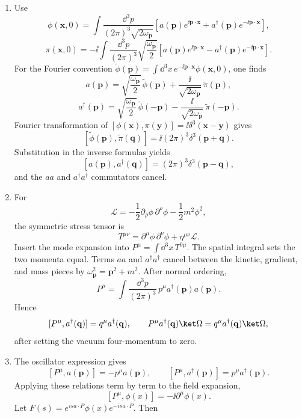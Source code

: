 \begin{enumerate}
\begin{enumerate}
\item
Use
\[
 \phi(\mathbf x,0)=\int\frac{\dd^3p}{(2\pi)^3\sqrt{2\omega_{\mathbf p}}}
 \left[a(\mathbf p)e^{\ii\mathbf p\cdot\mathbf x}
 +a^\dagger(\mathbf p)e^{-\ii\mathbf p\cdot\mathbf x}\right],
\]
\[
 \pi(\mathbf x,0)=-\ii\int\frac{\dd^3p}{(2\pi)^3}
 \sqrt{\frac{\omega_{\mathbf p}}2}
 \left[a(\mathbf p)e^{\ii\mathbf p\cdot\mathbf x}
 -a^\dagger(\mathbf p)e^{-\ii\mathbf p\cdot\mathbf x}\right].
\]
For the Fourier convention
\(\widetilde\phi(\mathbf p)=\int \dd^3x\,e^{-\ii\mathbf p\cdot\mathbf x}
\phi(\mathbf x,0)\), one finds
\[
 a(\mathbf p)=
 \sqrt{\frac{\omega_{\mathbf p}}2}\,\widetilde\phi(\mathbf p)
 +\frac{\ii}{\sqrt{2\omega_{\mathbf p}}}\,\widetilde\pi(\mathbf p),
\]
\[
 a^\dagger(\mathbf p)=
 \sqrt{\frac{\omega_{\mathbf p}}2}\,\widetilde\phi(-\mathbf p)
 -\frac{\ii}{\sqrt{2\omega_{\mathbf p}}}\,\widetilde\pi(-\mathbf p).
\]
Fourier transformation of
\([\phi(\mathbf x),\pi(\mathbf y)]=\ii\delta^3(\mathbf x-\mathbf y)\)
gives
\[
 [\widetilde\phi(\mathbf p),\widetilde\pi(\mathbf q)]
 =\ii(2\pi)^3\delta^3(\mathbf p+\mathbf q).
\]
Substitution in the inverse formulas yields
\[
 [a(\mathbf p),a^\dagger(\mathbf q)]
 =(2\pi)^3\delta^3(\mathbf p-\mathbf q),
\]
and the \(aa\) and \(a^\dagger a^\dagger\) commutators cancel.
\item
For
\[
 \mathcal L=-\frac12\partial_\rho\phi\,\partial^\rho\phi
 -\frac12m^2\phi^2,
\]
the symmetric stress tensor is
\[
 T^{\mu\nu}=\partial^\mu\phi\,\partial^\nu\phi
 +\eta^{\mu\nu}\mathcal L.
\]
Insert the mode expansion into \(P^\mu=\int \dd^3x\,T^{0\mu}\).
The spatial integral sets the two momenta equal.  Terms \(aa\) and
\(a^\dagger a^\dagger\) cancel between the kinetic, gradient, and mass
pieces by \(\omega_{\mathbf p}^2=\mathbf p^2+m^2\).  After normal ordering,
\[
 P^\mu=\int\frac{\dd^3p}{(2\pi)^3}\,
 p^\mu a^\dagger(\mathbf p)a(\mathbf p).
\]
Hence
\[
 [P^\mu,a^\dagger(\mathbf q)]=q^\mu a^\dagger(\mathbf q),
\qquad
 P^\mu a^\dagger(\mathbf q)\ket\Omega
 =q^\mu a^\dagger(\mathbf q)\ket\Omega,
\]
after setting the vacuum four-momentum to zero.
\item
The oscillator expression gives
\[
 [P^\mu,a(\mathbf p)]=-p^\mu a(\mathbf p),\qquad
 [P^\mu,a^\dagger(\mathbf p)]=p^\mu a^\dagger(\mathbf p).
\]
Applying these relations term by term to the field expansion,
\[
 [P^\mu,\phi(x)]=-\ii\partial^\mu\phi(x).
\]
Let \(F(s)=e^{is a\cdot P}\phi(x)e^{-is a\cdot P}\).  Then

\end{enumerate}
\end{enumerate}
